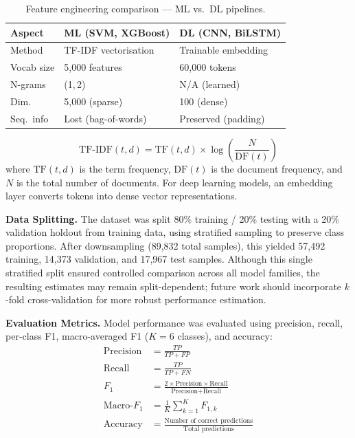 \begin{table}[!htb]
\centering
\caption{Feature engineering comparison --- ML vs.\ DL pipelines.}
\label{tab:feat_eng}
\footnotesize
\setlength{\tabcolsep}{3pt}
\begin{tabular}{@{}lll@{}}
\toprule
\textbf{Aspect} & \textbf{ML (SVM, XGBoost)} & \textbf{DL (CNN, BiLSTM)} \\
\midrule
Method      & TF-IDF vectorisation      & Trainable embedding \\
Vocab size  & 5{,}000 features          & 60{,}000 tokens \\
N-grams     & (1,\,2)                   & N/A (learned) \\
Dim.        & 5{,}000 (sparse)          & 100 (dense) \\
Seq.\ info  & Lost (bag-of-words)       & Preserved (padding) \\
\bottomrule
\end{tabular}
\end{table}
\begin{equation}
\text{TF-IDF}(t, d) = \text{TF}(t, d) \times \log\!\left(\frac{N}{\text{DF}(t)}\right)
\label{eq:tfidf}
\end{equation}
where $\text{TF}(t,d)$ is the term frequency, $\text{DF}(t)$ is the document frequency, and $N$ is the total number of documents. For deep learning models, an embedding layer converts tokens into dense vector representations.

\textbf{Data Splitting.} The dataset was split 80\% training / 20\% testing with a 20\% validation holdout from training data, using stratified sampling to preserve class proportions. After downsampling (89,832 total samples), this yielded 57,492 training, 14,373 validation, and 17,967 test samples. Although this single stratified split ensured controlled comparison across all model families, the resulting estimates may remain split-dependent; future work should incorporate $k$-fold cross-validation for more robust performance estimation.

\textbf{Evaluation Metrics.} Model performance was evaluated using precision, recall, per-class F1, macro-averaged F1 ($K=6$ classes), and accuracy:
\begin{align}
\text{Precision} &= \frac{TP}{TP + FP} \label{eq:precision}\\
\text{Recall} &= \frac{TP}{TP + FN} \label{eq:recall}\\
F_1 &= \frac{2 \times \text{Precision} \times \text{Recall}}{\text{Precision} + \text{Recall}} \label{eq:f1}\\
\text{Macro-}F_1 &= \frac{1}{K}\sum_{k=1}^{K} F_{1,k} \label{eq:macro_f1}\\
\text{Accuracy} &= \frac{\text{Number of correct predictions}}{\text{Total predictions}} \label{eq:accuracy}
\end{align}
